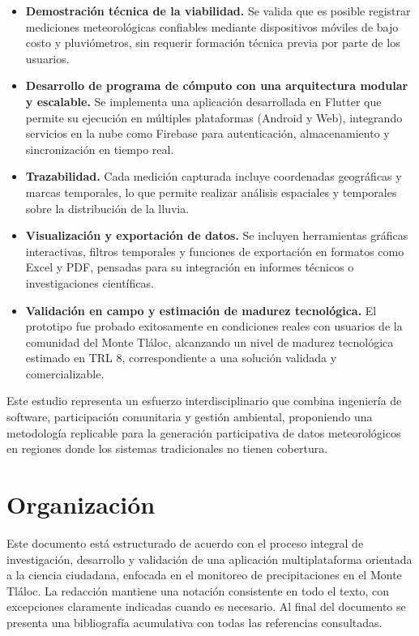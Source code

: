 \begin{itemize}
  \item \textbf{Demostración técnica de la viabilidad.} Se valida que es posible registrar mediciones meteorológicas confiables mediante dispositivos móviles de bajo costo y pluviómetros, sin requerir formación técnica previa por parte de los usuarios.
  
  \item \textbf{Desarrollo de programa de cómputo con una arquitectura modular y escalable.} Se implementa una aplicación desarrollada en Flutter que permite su ejecución en múltiples plataformas (Android y Web), integrando servicios en la nube como Firebase para autenticación, almacenamiento y sincronización en tiempo real.
  
  \item \textbf{Trazabilidad.} Cada medición capturada incluye coordenadas geográficas y marcas temporales, lo que permite realizar análisis espaciales y temporales sobre la distribución de la lluvia.
  
  \item \textbf{Visualización y exportación de datos.} Se incluyen herramientas gráficas interactivas, filtros temporales y funciones de exportación en formatos como Excel y PDF, pensadas para su integración en informes técnicos o investigaciones científicas.
  
  \item \textbf{Validación en campo y estimación de madurez tecnológica.} El prototipo fue probado exitosamente en condiciones reales con usuarios de la comunidad del Monte Tláloc, alcanzando un nivel de madurez tecnológica estimado en TRL 8, correspondiente a una solución validada y comercializable.
\end{itemize}

Este estudio representa un esfuerzo interdisciplinario que combina ingeniería de software, participación comunitaria y gestión ambiental, proponiendo una metodología replicable para la generación participativa de datos meteorológicos en regiones donde los sistemas tradicionales no tienen cobertura.




\section{Organización}

Este documento está estructurado de acuerdo con el proceso integral de investigación, desarrollo y validación de una aplicación multiplataforma orientada a la ciencia ciudadana, enfocada en el monitoreo de precipitaciones en el Monte Tláloc. La redacción mantiene una notación consistente en todo el texto, con excepciones claramente indicadas cuando es necesario. Al final del documento se presenta una bibliografía acumulativa con todas las referencias consultadas.

